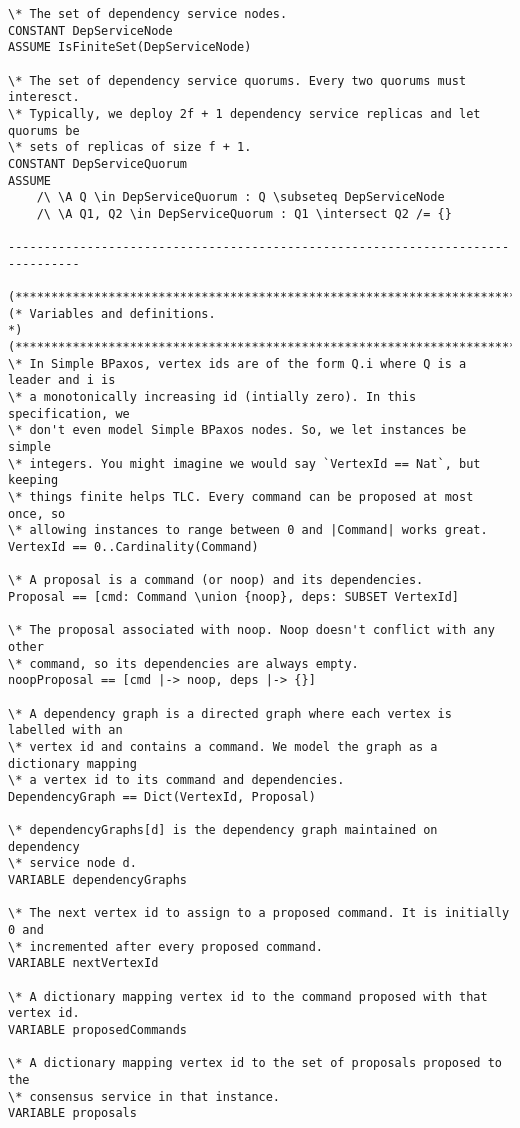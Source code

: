 \begin{verbatim}
\* The set of dependency service nodes.
CONSTANT DepServiceNode
ASSUME IsFiniteSet(DepServiceNode)

\* The set of dependency service quorums. Every two quorums must interesct.
\* Typically, we deploy 2f + 1 dependency service replicas and let quorums be
\* sets of replicas of size f + 1.
CONSTANT DepServiceQuorum
ASSUME
    /\ \A Q \in DepServiceQuorum : Q \subseteq DepServiceNode
    /\ \A Q1, Q2 \in DepServiceQuorum : Q1 \intersect Q2 /= {}

--------------------------------------------------------------------------------

(******************************************************************************)
(* Variables and definitions.                                                 *)
(******************************************************************************)
\* In Simple BPaxos, vertex ids are of the form Q.i where Q is a leader and i is
\* a monotonically increasing id (intially zero). In this specification, we
\* don't even model Simple BPaxos nodes. So, we let instances be simple
\* integers. You might imagine we would say `VertexId == Nat`, but keeping
\* things finite helps TLC. Every command can be proposed at most once, so
\* allowing instances to range between 0 and |Command| works great.
VertexId == 0..Cardinality(Command)

\* A proposal is a command (or noop) and its dependencies.
Proposal == [cmd: Command \union {noop}, deps: SUBSET VertexId]

\* The proposal associated with noop. Noop doesn't conflict with any other
\* command, so its dependencies are always empty.
noopProposal == [cmd |-> noop, deps |-> {}]

\* A dependency graph is a directed graph where each vertex is labelled with an
\* vertex id and contains a command. We model the graph as a dictionary mapping
\* a vertex id to its command and dependencies.
DependencyGraph == Dict(VertexId, Proposal)

\* dependencyGraphs[d] is the dependency graph maintained on dependency
\* service node d.
VARIABLE dependencyGraphs

\* The next vertex id to assign to a proposed command. It is initially 0 and
\* incremented after every proposed command.
VARIABLE nextVertexId

\* A dictionary mapping vertex id to the command proposed with that vertex id.
VARIABLE proposedCommands

\* A dictionary mapping vertex id to the set of proposals proposed to the
\* consensus service in that instance.
VARIABLE proposals


\end{verbatim}
